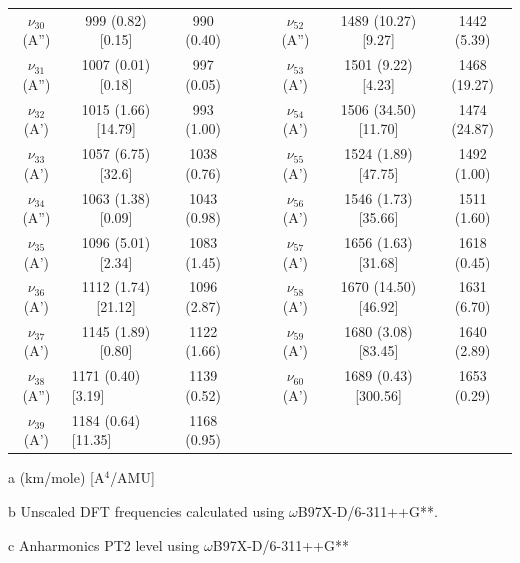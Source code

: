\begin{table}[H]
\begin{center}
\begin{threeparttable}
{\begin{tabular}{c c c c c c c c}
$\nu_{30}$ (A”) & 999 (0.82) [0.15] & 990 (0.40) &  &  & $\nu_{52}$ (A”) & 1489 (10.27) [9.27] & 1442 (5.39) \\ 
$\nu_{31}$ (A”) & 1007 (0.01) [0.18] & 997 (0.05) &  &  & $\nu_{53}$ (A’) & 1501 (9.22) [4.23] & 1468 (19.27) \\ 
$\nu_{32}$ (A’) & 1015 (1.66) [14.79] &  993 (1.00) &  &  & $\nu_{54}$ (A’) & 1506 (34.50) [11.70] & 1474 (24.87) \\ 
$\nu_{33}$ (A’) & 1057 (6.75) [32.6] & 1038 (0.76) &  &  & $\nu_{55}$ (A’) & 1524 (1.89) [47.75] & 1492 (1.00) \\ 
$\nu_{34}$ (A”) & 1063 (1.38) [0.09] & 1043 (0.98) &  &  & $\nu_{56}$ (A’) & 1546 (1.73) [35.66] & 1511 (1.60) \\ 
$\nu_{35}$ (A’) & 1096 (5.01) [2.34] & 1083 (1.45) &  &  & $\nu_{57}$ (A’) & 1656 (1.63) [31.68] & 1618 (0.45) \\ 
$\nu_{36}$ (A’) & 1112 (1.74) [21.12] & 1096 (2.87) &  &  & $\nu_{58}$ (A’) & 1670 (14.50) [46.92] & 1631 (6.70) \\ 
$\nu_{37}$ (A’) & 1145 (1.89) [0.80] & 1122 (1.66) &  &  & $\nu_{59}$ (A’) & 1680 (3.08) [83.45] & 1640 (2.89) \\ 
$\nu_{38}$ (A”) & \multicolumn{1}{l}{1171 (0.40) [3.19]} & 1139 (0.52) &  &  & $\nu_{60}$ (A’) & 1689 (0.43) [300.56] & 1653 (0.29) \\ 
$\nu_{39}$ (A’) & \multicolumn{1}{l}{1184 (0.64) [11.35]} & 1168 (0.95) &  &  & \multicolumn{1}{l}{} &  & \multicolumn{1}{l}{} \\ 
	\bottomrule
\end{tabular}}

\begin{tablenotes}
	\item[a] (km/mole) [A$^{4}$/AMU]
	\item[b] Unscaled DFT frequencies calculated using $\omega$B97X-D/6-311++G**.
	\item[c] Anharmonics PT2 level using $\omega$B97X-D/6-311++G** 
\end{tablenotes}
\end{threeparttable}
\end{center}
\label{freq-1-methylfluorene}
\end{table}

